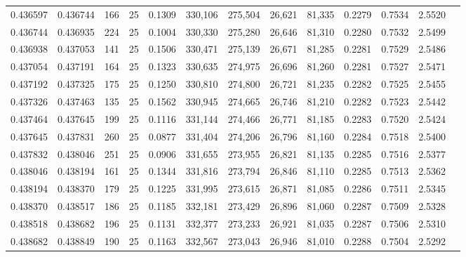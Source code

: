 \begin{tabular}{rrrrrrrrrrrrr}
0.436597 & 0.436744 &   166 &  25 &                                     0.1309 & 330,106 & 275,504 &  26,621 &  81,335 & 0.2279 & 0.7534 & 2.5520 \\
0.436744 & 0.436935 &   224 &  25 &                                     0.1004 & 330,330 & 275,280 &  26,646 &  81,310 & 0.2280 & 0.7532 & 2.5499 \\
0.436938 & 0.437053 &   141 &  25 &                                     0.1506 & 330,471 & 275,139 &  26,671 &  81,285 & 0.2281 & 0.7529 & 2.5486 \\
0.437054 & 0.437191 &   164 &  25 &                                     0.1323 & 330,635 & 274,975 &  26,696 &  81,260 & 0.2281 & 0.7527 & 2.5471 \\
0.437192 & 0.437325 &   175 &  25 &                                     0.1250 & 330,810 & 274,800 &  26,721 &  81,235 & 0.2282 & 0.7525 & 2.5455 \\
0.437326 & 0.437463 &   135 &  25 &                                     0.1562 & 330,945 & 274,665 &  26,746 &  81,210 & 0.2282 & 0.7523 & 2.5442 \\
0.437464 & 0.437645 &   199 &  25 &                                     0.1116 & 331,144 & 274,466 &  26,771 &  81,185 & 0.2283 & 0.7520 & 2.5424 \\
0.437645 & 0.437831 &   260 &  25 &                                     0.0877 & 331,404 & 274,206 &  26,796 &  81,160 & 0.2284 & 0.7518 & 2.5400 \\
0.437832 & 0.438046 &   251 &  25 &                                     0.0906 & 331,655 & 273,955 &  26,821 &  81,135 & 0.2285 & 0.7516 & 2.5377 \\
0.438046 & 0.438194 &   161 &  25 &                                     0.1344 & 331,816 & 273,794 &  26,846 &  81,110 & 0.2285 & 0.7513 & 2.5362 \\
0.438194 & 0.438370 &   179 &  25 &                                     0.1225 & 331,995 & 273,615 &  26,871 &  81,085 & 0.2286 & 0.7511 & 2.5345 \\
0.438370 & 0.438517 &   186 &  25 &                                     0.1185 & 332,181 & 273,429 &  26,896 &  81,060 & 0.2287 & 0.7509 & 2.5328 \\
0.438518 & 0.438682 &   196 &  25 &                                     0.1131 & 332,377 & 273,233 &  26,921 &  81,035 & 0.2287 & 0.7506 & 2.5310 \\
0.438682 & 0.438849 &   190 &  25 &                                     0.1163 & 332,567 & 273,043 &  26,946 &  81,010 & 0.2288 & 0.7504 & 2.5292 \\

\end{tabular}
